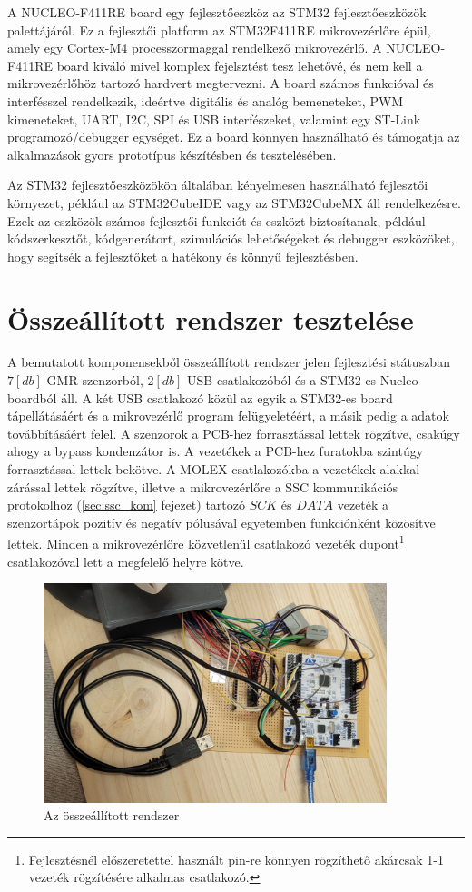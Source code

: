 A NUCLEO-F411RE board egy fejlesztőeszköz az STM32 fejlesztőeszközök palettájáról. Ez a fejlesztői platform az STM32F411RE mikrovezérlőre épül, amely egy Cortex-M4 processzormaggal rendelkező mikrovezérlő. A NUCLEO-F411RE board kiváló mivel komplex fejelsztést tesz lehetővé, és nem kell a mikrovezérlőhöz tartozó hardvert megtervezni. A board számos funkcióval és interfésszel rendelkezik, ideértve digitális és analóg bemeneteket, PWM kimeneteket, UART, I2C, SPI és USB interfészeket, valamint egy ST-Link programozó/debugger egységet. Ez a board könnyen használható és támogatja az alkalmazások gyors prototípus készítésben és tesztelésében.

Az STM32 fejlesztőeszközökön általában kényelmesen használható fejlesztői környezet, például az STM32CubeIDE vagy az STM32CubeMX áll rendelkezésre. Ezek az eszközök számos fejlesztői funkciót és eszközt biztosítanak, például kódszerkesztőt, kódgenerátort, szimulációs lehetőségeket és debugger eszközöket, hogy segítsék a fejlesztőket a hatékony és könnyű fejlesztésben.

\newpage
\section{Összeállított rendszer tesztelése}

A bemutatott komponensekből összeállított rendszer jelen fejlesztési státuszban $7[db]$ GMR szenzorból, $2[db]$ USB csatlakozóból és a STM32-es Nucleo boardból áll. A két USB csatlakozó közül az egyik a STM32-es board tápellátásáért és a mikrovezérlő program felügyeletéért, a másik pedig a adatok továbbításáért felel. A szenzorok a PCB-hez forrasztással lettek rögzítve, csakúgy ahogy a bypass kondenzátor is. A vezetékek a PCB-hez furatokba szintúgy forrasztással lettek bekötve. A MOLEX csatlakozókba a vezetékek alakkal zárással lettek rögzítve, illetve a mikrovezérlőre a SSC kommunikációs protokolhoz (\ref{sec:ssc_kom} fejezet) tartozó $SCK$ és $DATA$ vezeték a szenzortápok pozitív és negatív pólusával egyetemben funkciónként közösítve lettek. Minden a mikrovezérlőre közvetlenül csatlakozó vezeték dupont\footnote{Fejlesztésnél előszeretettel használt pin-re könnyen rögzíthető akárcsak 1-1 vezeték rögzítésére alkalmas csatlakozó.} csatlakozóval lett a megfelelő helyre kötve.

\begin{figure}[!ht]
\centering
\includegraphics[width=100mm, keepaspectratio]{figures/Csuklo_szog_teszt/mikrovez_2}
\caption{Az összeállított rendszer}
\label{fig:szummarendszer}
\end{figure}


